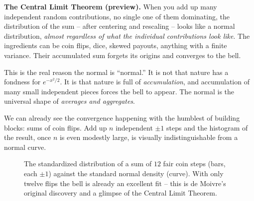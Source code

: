 \begin{aestheticbox}
\textbf{The Central Limit Theorem (preview).} When you add up many independent
random contributions, no single one of them dominating, the distribution of the
sum -- after centering and rescaling -- looks like a normal distribution,
\emph{almost regardless of what the individual contributions look like}. The
ingredients can be coin flips, dice, skewed payouts, anything with a finite
variance. Their accumulated sum forgets its origins and converges to the bell.
\end{aestheticbox}

This is the real reason the normal is ``normal.'' It is not that nature has a
fondness for $e^{-x^2/2}$. It is that nature is full of \emph{accumulation}, and
accumulation of many small independent pieces forces the bell to appear. The
normal is the universal shape of \emph{averages and aggregates}.

We can already see the convergence happening with the humblest of building blocks:
sums of coin flips. Add up $n$ independent $\pm 1$ steps and the histogram of the
result, once $n$ is even modestly large, is visually indistinguishable from a
normal curve.

\begin{figure}[H]
\centering
{}
\caption{The standardized distribution of a sum of $12$ fair coin steps (bars,
each $\pm1$) against the standard normal density (curve). With only twelve flips
the bell is already an excellent fit -- this is de Moivre's original discovery and
a glimpse of the Central Limit Theorem.}
\label{ch12:fig-clt}
\end{figure}


